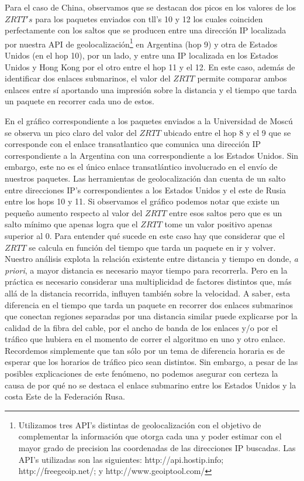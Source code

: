Para el caso de China, observamos que se destacan dos picos en los valores de los $ZRTT's$ para los paquetes enviados con tll's 10 y 12 los cuales coinciden perfectamente con los saltos que se producen entre una dirección IP localizada por nuestra API de geolocalización\footnote{Utilizamos tres API's distintas de geolocalización con el objetivo de complementar la información que otorga cada una y poder estimar con el mayor grado de precision las coordenadas de las direcciones IP buscadas. Las API's utilizadas son las siguientes: http://api.hostip.info; http://freegeoip.net/; y http://www.geoiptool.com/} en Argentina (hop 9) y otra de Estados Unidos (en el hop 10), por un lado, y entre una IP localizada en los Estados Unidos y Hong Kong por el otro entre el hop 11 y el 12. En este caso, además de identificar dos enlaces submarinos, el valor del $ZRTT$ permite comparar ambos enlaces entre sí aportando una impresión sobre la distancia y el tiempo que tarda un paquete en recorrer cada uno de estos.



En el gráfico correspondiente a los paquetes enviados a la Universidad de Moscú se observa un pico claro del valor del $ZRTT$ ubicado entre el hop 8 y el 9 que se corresponde con el enlace transatlantico que comunica una dirección IP correspondiente a la Argentina con una correspondiente a los Estados Unidos. Sin embargo, este no es el único enlace transatlántico involucrado en el envío de nuestros paquetes. Las herramientas de geolocalización dan cuenta de un salto entre direcciones IP's correspondientes a los Estados Unidos y el este de Rusia entre los hops 10 y 11. Si observamos el gráfico podemos notar que existe un pequeño aumento respecto al valor del $ZRTT$ entre esos saltos pero que es un salto mínimo que apenas logra que el $ZRTT$ tome un valor positivo apenas superior al 0. Para entender qué sucede en este caso hay que considerar que el $ZRTT$ se calcula en función del tiempo que tarda un paquete en ir y volver. Nuestro análisis explota la relación existente entre distancia y tiempo en donde, \textit{a priori}, a mayor distancia es necesario mayor tiempo para recorrerla. Pero en la práctica es necesario considerar una multiplicidad de factores distintos que, más allá de la distancia recorrida, influyen también sobre la velocidad. A saber, esta diferencia en el tiempo que tarda un paquete en recorrer dos enlaces submarinos que conectan regiones separadas por una distancia similar puede explicarse por la calidad de la fibra del cable, por el ancho de banda de los enlaces y/o por el tráfico que hubiera en el momento de correr el algoritmo en uno y otro enlace. Recordemos simplemente que tan sólo por un tema de diferencia horaria es de esperar que los horarios de tráfico pico sean distintos. Sin embargo, a pesar de las posibles explicaciones de este fenómeno, no podemos asegurar con certeza la causa de por qué no se destaca el enlace submarino entre los Estados Unidos y la costa Este de la Federación Rusa.


